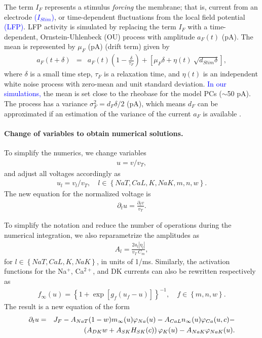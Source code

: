 \documentclass[10pt,letterpaper]{article}
\newcommand{\Ca}{Ca$^{2+}$}
\newcommand{\Na}{Na$^{+}$}
\newcommand{\lrRound}[1]{\left(#1\right)}
\newcommand{\lrSquare}[1]{\left[#1\right]}
\newcommand{\lrSet}[1]{\left\{#1\right\}}
\newcommand{\edit}[1]{\textcolor{blue}{#1}}
\begin{document}
The term $I_{F}$ represents a stimulus \textit{forcing} the membrane; that is, current from an electrode \edit{($I_{Stim}$)}, or time-dependent fluctuations from the local field potential \edit{(LFP)}. LFP activity is simulated by replacing the term $I_{F}$ with a  time-dependent, Ornstein-Uhlenbeck (OU) process with amplitude $a_{F}(t)$ (pA). The mean is represented by  $\mu_{F}$ (pA) (drift term)
\cite{rudolph2003characterization} given by \cite{gillespie1996exact} 
\begin{eqnarray}
\label{eq:OU}
{a}_{F}(t+\delta) &=& a_{F}(t) \lrRound{1 -  \frac{\delta}{\tau_{F}}}  +
\lrSquare{ \mu_{F} \delta + \eta(t) ~\sqrt{d_{Stim} \delta}},
\end{eqnarray}
where $\delta$ is a small time step, $\tau_{F}$ is a relaxation time, and $\eta(t)$ is an independent
white noise process with zero-mean and unit standard deviation. \edit{In our simulations,} the mean is set close to the rheobase for the model PCs ($\sim$50 pA). The process has a variance
$\sigma_{F}^2 = d_{F} \delta /2$ (pA), which means $d_{F}$ can be
approximated if an estimation of the variance of the current $a_{F}$ is
available \cite{rudolph2004method,destexhe2004novel}.  

\paragraph{Change of variables to obtain numerical solutions.}
To simplify the numerics, we change variables 
\begin{eqnarray}
    u = v/v_T, 
\end{eqnarray}
and adjust all voltages accordingly as 
\begin{eqnarray}
    u_l = v_l/v_T, \quad l \in \left\{NaT,CaL,K,NaK,m,n,w \right\}.
\end{eqnarray}
The new equation for the normalized voltage is 
\begin{eqnarray}
    \partial_t u = \frac{\partial_t v}{v_T}.
\end{eqnarray}

To simplify the notation and reduce the number of operations during the numerical integration, we also reparametrize the amplitudes as 
\begin{eqnarray}
\label{eq:normA}
A_l = \frac{2 a_l |\eta_l|}{v_T~C_m}, 
\end{eqnarray} 
for $l \in \left\{NaT,CaL,K,NaK \right\}$, in units of 1/ms. 
Similarly,
the activation functions for the {\Na}, {\Ca}, and DK currents can also be rewritten respectively
as 
\begin{eqnarray}
f_{\infty}(u) = \lrSet{1 + \exp\left[g_f \left(u_f-u \right) \right]}^{-1}, \quad{f \in  \left\{m,n,w \right\}}.
\end{eqnarray}
The result is a new equation of the form
\begin{eqnarray}
\partial_t u &=& J_F -A_{NaT}(1-w)m_{\infty}(u) \varphi_{Na}(u) - A_{CaL}n_{\infty}(u) \varphi_{Ca}(u,c)- \notag \\
&& \left(A_{DK}w + A_{SK}H_{SK}(c)\right)\varphi_{K}(u)- A_{NaK}\varphi_{NaK}(u
).
\end{eqnarray}
 
\end{document}
